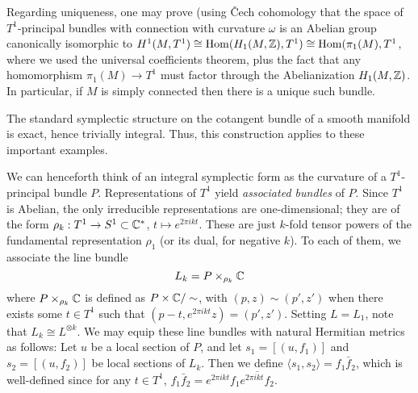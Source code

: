 \documentclass[parskip=half]{scrartcl}
\begin{document}
\begin{rem}\leavevmode
	\begin{numberedlist}
		\item Regarding uniqueness, one may prove (using \v{C}ech cohomology that the space of $T^1$-principal bundles with connection with curvature $\omega$ is an Abelian group canonically isomorphic to $H^1(M,T^1)\cong \operatorname{Hom}(H_1(M,\mathbb{Z}),T^1)\cong \operatorname{Hom}(\pi_1(M),T^1$, where we used the universal coefficients theorem, plus the fact that any homomorphism $\pi_1(M)\to T^1$ must factor through the Abelianization $H_1(M,\mathbb{Z})$. In particular, if $M$ is simply connected then there is a unique such bundle. 
		\item The standard symplectic structure on the cotangent bundle of a smooth manifold is exact, hence trivially integral. Thus, this construction applies to these important examples.
	\end{numberedlist}
\end{rem}

We can henceforth think of an integral symplectic form as the curvature of a $T^1$-principal bundle $P$. Representations of $T^1$ yield \emph{associated bundles} of $P$. Since $T^1$ is Abelian, the only irreducible representations are one-dimensional; they are of the form $\rho_k: T^1\to S^1\subset \mathbb{C}^*$, $t\mapsto e^{2\pi i k t}$. These are just $k$-fold tensor powers of the fundamental representation $\rho_1$ (or its dual, for negative $k$). To each of them, we associate the line bundle
\begin{equation*}
	L_k=P\times_{\rho_k}\mathbb{C}
\end{equation*}
where $P\times_{\rho_k}\mathbb{C}$ is defined as $P\times \mathbb{C}/\sim$, with $(p,z)\sim (p',z')$ when there exists some $t\in T^1$ such that $(p-t,e^{2\pi ik t}z)=(p',z')$. Setting $L=L_1$, note that $L_k\cong L^{\otimes k}$. We may equip these line bundles with natural Hermitian metrics as follows: Let $u$ be a local section of $P$, and let $s_1=[(u,f_1)]$ and $s_2=[(u,f_2)]$ be local sections of $L_k$. Then we define $\langle s_1,s_2\rangle=f_1\bar f_2$, which is well-defined since for any $t\in T^1$, $f_1\bar f_2=e^{2\pi ik t}f_1 \overline{e^{2\pi ikt}f_2}$.
\end{document}
